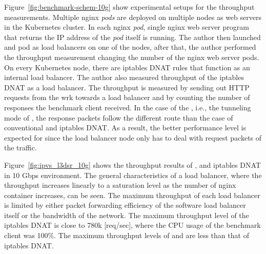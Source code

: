 Figure~\ref{fig:benchmark-schem-10g} show experimental setups for the throughput measurements.
Multiple nginx {\em pods} are deployed on multiple nodes as web servers in the Kubernetes cluster.
In each nginx {\em pod}, single nginx web server program that returns the IP address of the {\em pod} itself is running.
The author then launched  and  pod as load balancers on one of the nodes, after that, the author performed the throughput measurement changing the number of the nginx web server pods.
On every Kubernetes node, there are iptables DNAT rules that function as an internal load balancer.
The author also measured throughput of the iptables DNAT as a load balancer.
The throughput is measured by sending out HTTP requests from the wrk towards a load balancer and by counting the number of responses the benchmark client received.
In the case of the , i.e., the tunneling mode of , the response packets follow the different route than the case of conventional  and iptables DNAT.
As a result, the better performance level is expected for  since the load balancer node only has to deal with request packets of the traffic.

\FloatBarrier

Figure~\ref{fig:ipvs_l3dsr_10g} shows the throughput results of ,  and iptables DNAT in 10 Gbps environment.
The general characteristics of a load balancer, where the throughput increases linearly to a saturation level as the number of nginx container increases, can be seen.
The maximum throughput of each load balancer is limited by either packet forwarding efficiency of the software load balancer itself or the bandwidth of the network.
The maximum throughput level of the iptables DNAT is close to 780k [req/sec], where the CPU usage of the benchmark client was 100\%.
The maximum throughput levels of  and  are less than that of iptables DNAT. 

